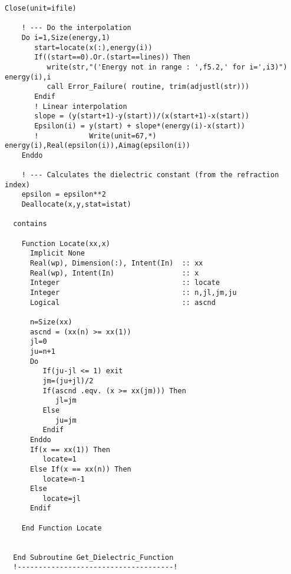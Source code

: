 \begin{lstlisting}[style=FormattedNumber, language=FORTRAN]
    Close(unit=ifile)

    ! --- Do the interpolation
    Do i=1,Size(energy,1)
       start=locate(x(:),energy(i))
       If((start==0).Or.(start==lines)) Then
          write(str,"('Energy not in range : ',f5.2,' for i=',i3)") energy(i),i
          call Error_Failure( routine, trim(adjustl(str)))
       Endif
       ! Linear interpolation
       slope = (y(start+1)-y(start))/(x(start+1)-x(start))
       Epsilon(i) = y(start) + slope*(energy(i)-x(start))
       !            Write(unit=67,*) energy(i),Real(epsilon(i)),Aimag(epsilon(i))
    Enddo
    
    ! --- Calculates the dielectric constant (from the refraction index)
    epsilon = epsilon**2
    Deallocate(x,y,stat=istat)

  contains
    
    Function Locate(xx,x)
      Implicit None
      Real(wp), Dimension(:), Intent(In)  :: xx
      Real(wp), Intent(In)                :: x
      Integer                             :: locate
      Integer                             :: n,jl,jm,ju
      Logical                             :: ascnd
      
      n=Size(xx)
      ascnd = (xx(n) >= xx(1))
      jl=0
      ju=n+1
      Do
         If(ju-jl <= 1) exit
         jm=(ju+jl)/2
         If(ascnd .eqv. (x >= xx(jm))) Then
            jl=jm
         Else
            ju=jm
         Endif
      Enddo
      If(x == xx(1)) Then
         locate=1
      Else If(x == xx(n)) Then
         locate=n-1
      Else
         locate=jl
      Endif
      
    End Function Locate
    

  End Subroutine Get_Dielectric_Function
  !-------------------------------------!
\end{lstlisting}

